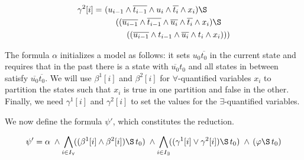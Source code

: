 \begin{small}
\begin{minipage}{.48\textwidth}
          \end{minipage}
          \hspace{-.02\textwidth}
          \begin{minipage}{.48\textwidth}
            \begin{equation*} \begin{split}
              \gamma^2[i] = \ & (u_{i-1}\wedge\overline{t_{i-1}}\wedge u_i\wedge\overline{t_i}\wedge x_i)
            \S \\
            & \ \ \ \
            ((\overline{u_{i-1}}\wedge\overline{t_{i-1}}\wedge\overline{u_i}\wedge\overline{t_i}\wedge x_i)
            \S \\
            & \ \ \ \ \ \ \ \
            ((\overline{u_{i-1}}\wedge t_{i-1}\wedge\overline{u_i}\wedge t_i\wedge x_i)))
            \end{split}\end{equation*}
          \end{minipage}
        \par\bigskip
        \end{small}

        The formula $\alpha$ initializes a model as follows: it sets $u_0\overline{t_0}$ in the current state and requires that in the past there is a state with $\overline{u_0}t_0$ and all states in between satisfy $\overline{u_0}\overline{t_0}$. We will use $\beta^1[i]$ and $\beta^2[i]$ for $\forall$-quantified variables $x_i$ to partition the states such that $x_i$ is true in one partition and false in the other. Finally, we need $\gamma^1[i]$ and $\gamma^2[i]$ to set the values for the $\exists$-quantified variables.

        We now define the formula $\psi'$, which constitutes the reduction.

        $$\psi'= \alpha \;
            \wedge \displaystyle \bigwedge_{i\in I_\forall}\!((\beta^1[i] \wedge \beta^2[i])\S\, t_0)\;
            \wedge \displaystyle \bigwedge_{i\in I_\exists}\!((\gamma^1[i] \vee \gamma^2[i])\S\, t_0)\;
            \wedge \,(\varphi \S\, t_0)$$

